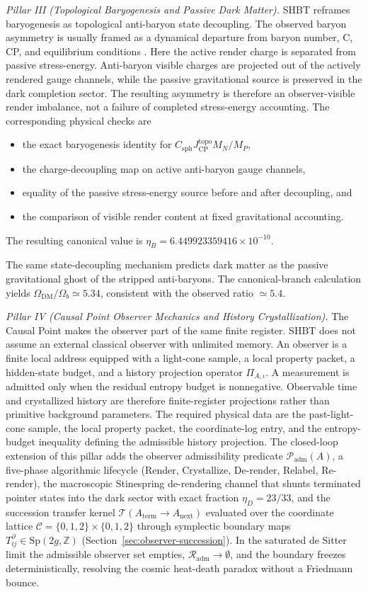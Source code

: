 \documentclass[11pt,letterpaper]{article}
\theoremstyle{plain}
\newcommand{\MP}{M_P}
\newcommand{\Padm}{\mathcal P_{\text{adm}}}
\begin{document}
\emph{Pillar III (Topological Baryogenesis and Passive Dark Matter).}  SHBT
reframes baryogenesis as topological anti-baryon state decoupling.  The observed
baryon asymmetry is usually framed as a dynamical departure from baryon number,
C, CP, and equilibrium conditions \cite{sakharov1967}.  Here the active render
charge is separated from passive stress-energy.  Anti-baryon visible charges
are projected out of the actively rendered gauge channels, while the passive
gravitational source is preserved in the dark completion sector.  The resulting
asymmetry is therefore an observer-visible render imbalance, not a failure of
completed stress-energy accounting.  The corresponding physical checks are
\begin{itemize}
\item the exact baryogenesis identity for \(C_{\text{sph}}J_{\text{CP}}^{\text{topo}}M_N/\MP\),
\item the charge-decoupling map on active anti-baryon gauge channels,
\item equality of the passive stress-energy source before and after decoupling, and
\item the comparison of visible render content at fixed gravitational accounting.
\end{itemize}
The resulting canonical value is
\(\eta_B=6.449923359416\times10^{-10}\).

The same state-decoupling mechanism predicts dark matter as the passive
gravitational ghost of the stripped anti-baryons.  The canonical-branch
calculation yields \(\Omega_{\text{DM}}/\Omega_b\simeq5.34\), consistent with the
observed ratio \(\simeq5.4\).

\emph{Pillar IV (Causal Point Observer Mechanics and History
Crystallization).}  The Causal Point makes the observer part of the same
finite register.
SHBT does not assume an external classical observer with unlimited memory.  An
observer is a finite local address equipped with a light-cone sample, a local
property packet, a hidden-state budget, and a history projection operator
$\Pi_{A,\iota}$.  A measurement is admitted only when the residual entropy
budget is nonnegative.  Observable time and crystallized history are therefore
finite-register projections rather than primitive background parameters.  The
required physical data are the past-light-cone sample, the local property
packet, the coordinate-log entry, and the entropy-budget inequality defining
the admissible history projection.  The closed-loop extension of this pillar
adds the observer admissibility predicate $\Padm(A)$, a five-phase algorithmic
lifecycle (Render, Crystallize, De-render, Relabel, Re-render), the macroscopic
Stinespring de-rendering channel that shunts terminated pointer states into
the dark sector with exact fraction $\eta_D=23/33$, and the succession
transfer kernel $\mathcal T(A_{\text{term}}\to A_{\text{next}})$ evaluated over
the coordinate lattice $\mathcal C=\{0,1,2\}\times\{0,1,2\}$ through symplectic
boundary maps $T^\partial_{ij}\in\mathrm{Sp}(2g,\mathbb Z)$
(Section~\ref{sec:observer-succession}).  In the saturated de Sitter limit the
admissible observer set empties, $\mathcal R_{\text{adm}}\to\emptyset$, and the
boundary freezes deterministically, resolving the cosmic heat-death paradox
without a Friedmann bounce.
\end{document}
